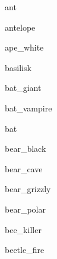 \documentclass[letterpaper,serif]{module}
\begin{document}
\raggedbottom

\begin{newmonster}{ant}\end{newmonster}

\begin{newmonster}{antelope}\end{newmonster}

\begin{newmonster}{ape_white}\end{newmonster}

\begin{newmonster}{basilisk}\end{newmonster}

\begin{newmonster}{bat_giant}\end{newmonster}

\begin{newmonster}{bat_vampire}\end{newmonster}

\begin{newmonster}{bat}\end{newmonster}

\begin{newmonster}{bear_black}\end{newmonster}

\begin{newmonster}{bear_cave}\end{newmonster}

\begin{newmonster}{bear_grizzly}\end{newmonster}

\begin{newmonster}{bear_polar}\end{newmonster}

\begin{newmonster}{bee_killer}\end{newmonster}

\begin{newmonster}{beetle_fire}\end{newmonster}
\end{document}

